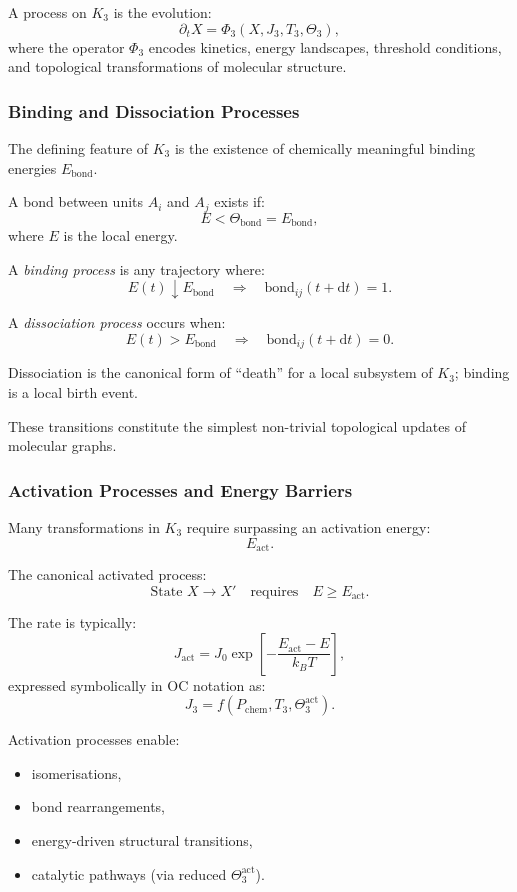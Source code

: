 A process on $K_3$ is the evolution:
\[
\partial_t X = \Phi_3(X, J_3, T_3, \Theta_3),
\]
where the operator $\Phi_3$ encodes kinetics, energy landscapes,
threshold conditions, and topological transformations of molecular 
structure.

\subsubsection{Binding and Dissociation Processes}

The defining feature of $K_3$ is the existence of chemically meaningful
binding energies $E_{\text{bond}}$.

A bond between units $A_i$ and $A_j$ exists if:
\[
E < \Theta_{\text{bond}} = E_{\text{bond}},
\]
where $E$ is the local energy.

A \emph{binding process} is any trajectory where:
\[
E(t) \downarrow E_{\text{bond}} \quad \Rightarrow \quad \text{bond}_{ij}(t+\mathrm{d}t)=1.
\]

A \emph{dissociation process} occurs when:
\[
E(t) > E_{\text{bond}} \quad \Rightarrow \quad \text{bond}_{ij}(t+\mathrm{d}t)=0.
\]

Dissociation is the canonical form of ``death'' for a local subsystem of
$K_3$; binding is a local birth event.

These transitions constitute the simplest non-trivial topological
updates of molecular graphs.

\subsubsection{Activation Processes and Energy Barriers}

Many transformations in $K_3$ require surpassing an activation energy:
\[
E_{\text{act}}.
\]

The canonical activated process:
\[
\text{State } X \to X' \quad \text{requires} \quad E \ge E_{\text{act}}.
\]

The rate is typically:
\[
J_{\text{act}} = J_0 \exp\!\left[-\frac{E_{\text{act}}-E}{k_BT}\right],
\]
expressed symbolically in OC notation as:
\[
J_3 = f(P_\text{chem}, T_3, \Theta_3^{\text{act}}).
\]

Activation processes enable:
\begin{itemize}
    \item isomerisations,
    \item bond rearrangements,
    \item energy-driven structural transitions,
    \item catalytic pathways (via reduced $\Theta_3^{\text{act}}$).
\end{itemize}

